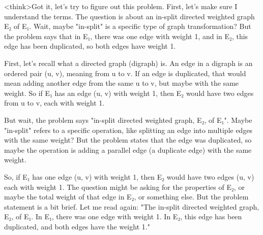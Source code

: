 <think>Got it, let's try to figure out this problem. First, let's make sure I understand the terms. The question is about an in-split directed weighted graph E₂ of E₁. Wait, maybe "in-split" is a specific type of graph transformation? But the problem says that in E₁, there was one edge with weight 1, and in E₂, this edge has been duplicated, so both edges have weight 1. 

First, let's recall what a directed graph (digraph) is. An edge in a digraph is an ordered pair (u, v), meaning from u to v. If an edge is duplicated, that would mean adding another edge from the same u to v, but maybe with the same weight. So if E₁ has an edge (u, v) with weight 1, then E₂ would have two edges from u to v, each with weight 1. 

But wait, the problem says "in-split directed weighted graph, E₂, of E₁". Maybe "in-split" refers to a specific operation, like splitting an edge into multiple edges with the same weight? But the problem states that the edge was duplicated, so maybe the operation is adding a parallel edge (a duplicate edge) with the same weight. 

So, if E₁ has one edge (u, v) with weight 1, then E₂ would have two edges (u, v) each with weight 1. The question might be asking for the properties of E₂, or maybe the total weight of that edge in E₂, or something else. But the problem statement is a bit brief. Let me read again: "The in-split directed weighted graph, E₂, of E₁. In E₁, there was one edge with weight 1. In E₂, this edge has been duplicated, and both edges have the weight 1." 

